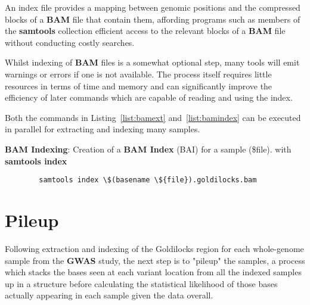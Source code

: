 An index file provides a mapping between genomic positions and the compressed
blocks of a \textbf{BAM} file that contain them, affording programs such as
members of the \textbf{samtools} collection efficient access to the relevant
blocks of a \textbf{BAM} file without conducting costly searches.

Whilst indexing of \textbf{BAM} files is a somewhat optional step, many tools
will emit warnings or errors if one is not available. The process itself
requires little resources in terms of time and memory and can significantly
improve the efficiency of later commands which are capable of reading and using
the index.

Both the commands in Listing~\ref{list:bamext} and~\ref{list:bamindex} can
be executed in parallel for extracting and indexing many samples.

\begin{listing}[H]
    \caption[bamindex]{\textbf{BAM Indexing}: Creation of a \textbf{BAM Index} (BAI)
        for a sample (\$file). with \textbf{samtools
    index}\citep{man:samtools}}
    \label{list:bamindex}
    \begin{verbatim}
        samtools index \$(basename \${file}).goldilocks.bam
    \end{verbatim}
\end{listing}



\section{Pileup}

Following extraction and indexing of the Goldilocks region for each whole-genome
sample from the \textbf{GWAS} study, the next step is to "pileup" the samples,
a process which stacks the bases seen at each variant location from all the
indexed samples up in a structure before calculating the statistical likelihood
of those bases actually appearing in each sample given the data overall.

